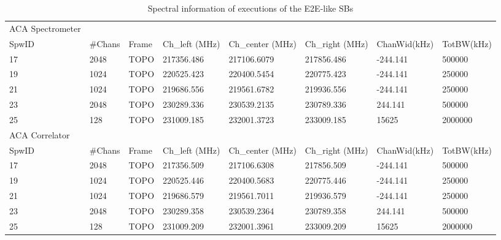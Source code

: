 \begin{landscape}
\begin{table}[]
\centering
\caption{Spectral information of executions of the E2E-like SBs}\label{tab:listobs}
\begin{tabular}{llllllll}
\hline \hline
ACA Spectrometer &         &       &                &                  &                 &              &            \\
SpwID            & \#Chans & Frame & Ch\_left (MHz) & Ch\_center (MHz) & Ch\_right (MHz) & ChanWid(kHz) & TotBW(kHz) \\ \hline
17               & 2048    & TOPO  & 217356.486     & 217106.6079      & 217856.486      & -244.141     & 500000     \\
19               & 1024    & TOPO  & 220525.423     & 220400.5454      & 220775.423      & -244.141     & 250000     \\
21               & 1024    & TOPO  & 219686.556     & 219561.6782      & 219936.556      & -244.141     & 250000     \\
23               & 2048    & TOPO  & 230289.336     & 230539.2135      & 230789.336      & 244.141      & 500000     \\
25               & 128     & TOPO  & 231009.185     & 232001.3723      & 233009.185      & 15625        & 2000000    \\ \hline
ACA Correlator   &         &       &                &                  &                 &              &            \\
SpwID            & \#Chans & Frame & Ch\_left (MHz) & Ch\_center (MHz) & Ch\_right (MHz) & ChanWid(kHz) & TotBW(kHz) \\ \hline
17               & 2048    & TOPO  & 217356.509     & 217106.6308      & 217856.509      & -244.141     & 500000     \\
19               & 1024    & TOPO  & 220525.446     & 220400.5683      & 220775.446      & -244.141     & 250000     \\
21               & 1024    & TOPO  & 219686.579     & 219561.7011      & 219936.579      & -244.141     & 250000     \\
23               & 2048    & TOPO  & 230289.358     & 230539.2364      & 230789.358      & 244.141      & 500000     \\
25               & 128     & TOPO  & 231009.209     & 232001.3961      & 233009.209      & 15625        & 2000000   \\ \hline \hline
\end{tabular}
\end{table}
\end{landscape}


